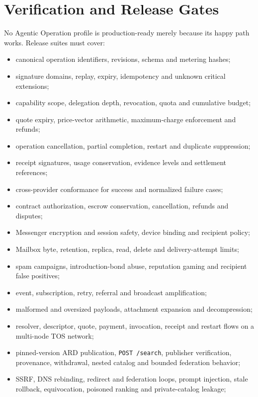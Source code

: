 \documentclass[11pt,oneside]{article}
\begin{document}
\section{Verification and Release Gates}

No Agentic Operation profile is production-ready merely because its happy path works. Release
suites must cover:

\begin{itemize}
  \item canonical operation identifiers, revisions, schema and metering hashes;
  \item signature domains, replay, expiry, idempotency and unknown critical extensions;
  \item capability scope, delegation depth, revocation, quota and cumulative budget;
  \item quote expiry, price-vector arithmetic, maximum-charge enforcement and refunds;
  \item operation cancellation, partial completion, restart and duplicate suppression;
  \item receipt signatures, usage conservation, evidence levels and settlement references;
  \item cross-provider conformance for success and normalized failure cases;
  \item contract authorization, escrow conservation, cancellation, refunds and disputes;
  \item Messenger encryption and session safety, device binding and recipient policy;
  \item Mailbox byte, retention, replica, read, delete and delivery-attempt limits;
  \item spam campaigns, introduction-bond abuse, reputation gaming and recipient false
        positives;
  \item event, subscription, retry, referral and broadcast amplification;
  \item malformed and oversized payloads, attachment expansion and decompression;
  \item resolver, descriptor, quote, payment, invocation, receipt and restart flows on a
        multi-node TOS network;
  \item pinned-version ARD publication, \texttt{POST /search}, publisher verification,
        provenance, withdrawal, nested catalog and bounded federation behavior;
  \item SSRF, DNS rebinding, redirect and federation loops, prompt injection, stale rollback,
        equivocation, poisoned ranking and private-catalog leakage;

\end{itemize}
\end{document}
